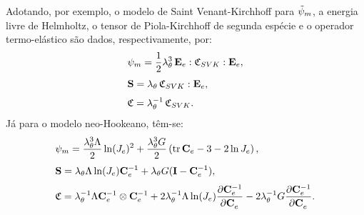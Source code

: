 \documentclass[Tese.tex]{subfiles}
\begin{document}

Adotando, por exemplo, o modelo de Saint Venant-Kirchhoff para $\tilde{\psi}_m$, a energia livre de Helmholtz, o tensor de Piola-Kirchhoff de segunda espécie e o operador termo-elástico são dados, respectivamente, por:
\begin{align}
&\psi_m = \dfrac{1}{2}\lambda_{\theta}^3\,\mathbf{E}_e:\mathfrak{C}_{SVK}:\mathbf{E}_e, \label{eq:helm-svk-mult}\\[0.1cm]
&\mathbf{S} = \lambda_{\theta}\,\mathfrak{C}_{SVK}:\mathbf{E}_e, \\[0.1cm]
&\mathfrak{C} = \lambda_{\theta}^{-1}\,\mathfrak{C}_{SVK}.
\end{align}
Já para o modelo neo-Hookeano, têm-se:
\begin{align}
&\psi_m = \dfrac{\lambda_{\theta}^3\Lambda}{2}\ln(J_e)^2 + \dfrac{\lambda_{\theta}^3G}{2}\left(\text{tr}\,\mathbf{C}_e - 3 - 2\ln J_e\right), \\[0.1cm]
&\mathbf{S} = \lambda_{\theta}\Lambda\ln(J_e)\mathbf{C}_e^{-1} + \lambda_{\theta}G(\mathbf{I}-\mathbf{C}_e^{-1}), \\[0.1cm]
&\mathfrak{C} = \lambda_{\theta}^{-1}\Lambda\mathbf{C}_e^{-1}\otimes\mathbf{C}_e^{-1}+2\lambda_{\theta}^{-1}\Lambda\ln(J_e)\dfrac{\partial\mathbf{C}_e^{-1}}{\partial\mathbf{C}_e^{\;\;}} - 2\lambda_{\theta}^{-1}G\dfrac{\partial\mathbf{C}_e^{-1}}{\partial\mathbf{C}_e^{\;\;}}.
\end{align}
\end{document}
